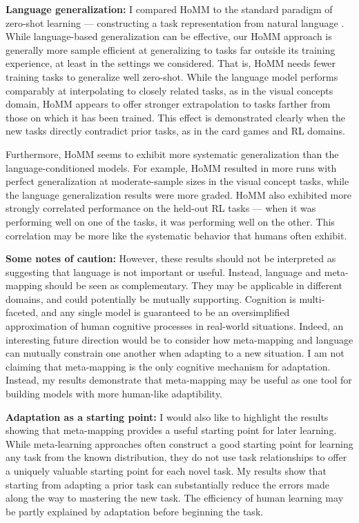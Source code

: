 \textbf{Language generalization:} I compared HoMM to the standard paradigm of zero-shot learning --- constructing a task representation from natural language \citep[e.g.][also see below]{Larochelle2008}. While language-based generalization can be effective, our HoMM approach is generally more sample efficient at generalizing to tasks far outside its training experience, at least in the settings we considered. That is, HoMM needs fewer training tasks to generalize well zero-shot. While the language model performs comparably at interpolating to closely related tasks, as in the visual concepts domain, HoMM appears to offer stronger extrapolation to tasks farther from those on which it has been trained. This effect is demonstrated clearly when the new tasks directly contradict prior tasks, as in the card games and RL domains.\par

Furthermore, HoMM seems to exhibit more systematic generalization than the language-conditioned models. For example, HoMM resulted in more runs with perfect generalization at moderate-sample sizes in the visual concept tasks, while the language generalization results were more graded. HoMM also exhibited more strongly correlated performance on the held-out RL tasks --- when it was performing well on one of the tasks, it was performing well on the other. This correlation may be more like the systematic behavior that humans often exhibit. \par

\textbf{Some notes of caution:} However, these results should not be interpreted as suggesting that language is not important or useful. Instead, language and meta-mapping should be seen as complementary. They may be applicable in different domains, and could potentially be mutually supporting. Cognition is multi-faceted, and any single model is guaranteed to be an oversimplified approximation of human cognitive processes in real-world situations. Indeed, an interesting future direction would be to consider how meta-mapping and language can mutually constrain one another when adapting to a new situation. I am not claiming that meta-mapping is the only cognitive mechanism for adaptation. Instead, my results demonstrate that meta-mapping may be useful as one tool for building models with more human-like adaptibility.  \par

\textbf{Adaptation as a starting point:} I would also like to highlight the results showing that meta-mapping provides a useful starting point for later learning. While meta-learning approaches often construct a good starting point for learning any task from the known distribution, they do not use task relationships to offer a uniquely valuable starting point for each novel task. My results show that starting from adapting a prior task can substantially reduce the errors made along the way to mastering the new task. The efficiency of human learning may be partly explained by adaptation before beginning the task. \par 

